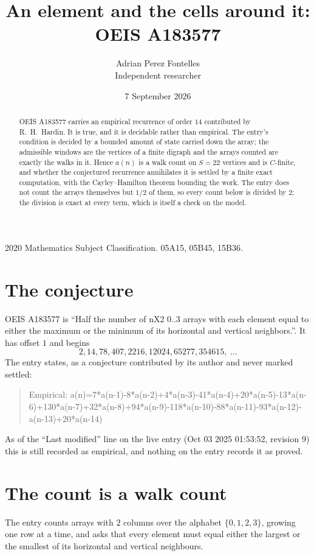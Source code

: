 \documentclass[11pt,a4paper]{article}
\title{An element and the cells around it: OEIS A183577}
\author{Adrian Perez Fontelles\\ \small Independent researcher}
\date{7 September 2026}
\theoremstyle{plain}
\theoremstyle{definition}
\begin{document}
\maketitle

\begin{abstract}
OEIS A183577 carries an empirical recurrence of order $14$ contributed by R.~H.~Hardin. It is
true, and it is decidable rather than empirical. The entry's condition is decided by a bounded amount of state carried down the array; the
admissible windows are the vertices of a finite digraph and the arrays counted are exactly the
walks in it. Hence $a(n)$ is a walk count on $S=22$ vertices and is $C$-finite, and whether the
conjectured recurrence annihilates it is settled by a finite exact computation, with the
Cayley--Hamilton theorem bounding the work. The entry does not count the arrays themselves but $1/2$ of them, so every count below is divided by $2$; the division is exact at every term, which is itself a check on the model.
\end{abstract}

\noindent\small 2020 Mathematics Subject Classification. 05A15, 05B45, 15B36.\normalsize

\section{The conjecture}

OEIS A183577 is ``Half the number of nX2 0..3 arrays with each element equal to either the maximum or the minimum of its horizontal and vertical neighbors.''. It has offset $1$ and begins
\[
2, 14, 78, 407, 2216, 12024, 65277, 354615,\ \dots
\]
The entry states, as a conjecture contributed by its author and never marked settled:
\begin{quote}
Empirical: a(n)=7*a(n-1)-8*a(n-2)+4*a(n-3)-41*a(n-4)+20*a(n-5)-13*a(n-6)+130*a(n-7)+32*a(n-8)+94*a(n-9)-118*a(n-10)-88*a(n-11)-93*a(n-12)-a(n-13)+20*a(n-14)
\end{quote}
As of the ``Last modified'' line on the live entry (Oct 03 2025 01:53:52, revision 9) this is still
recorded as empirical, and nothing on the entry records it as proved.

\section{The count is a walk count}

The entry counts arrays with $2$ columns over the alphabet $\{0,1,2,3\}$, growing one row at a time, and asks that every element must equal either the largest or the smallest of its horizontal and vertical neighbours.
\end{document}
